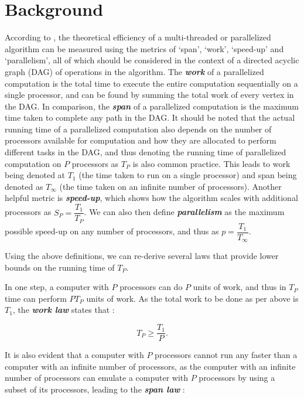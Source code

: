 \documentclass{article}
\begin{document}
\section{Background}

According to \cite{CLRS}, the theoretical efficiency of a multi-threaded or parallelized algorithm can be measured using the metrics of `span', `work', `speed-up' and `parallelism', all of which should be considered in the context of a directed acyclic graph (DAG) of operations in the algorithm.
The \textit{\textbf{work}} of a parallelized computation is the total time to execute the entire computation sequentially on a single processor, and can be found by summing the total work of every vertex in the DAG.
In comparison, the \textit{\textbf{span}} of a parallelized computation is the maximum time taken to complete any path in the DAG.
It should be noted that the actual running time of a parallelized computation also depends on the number of processors available for computation and how they are allocated to perform different tasks in the DAG, and thus denoting the running time of parallelized computation on \(P\) processors as \(T_P\) is also common practice.
This leads to work being denoted at \(T_1\) (the time taken to run on a single processor) and span being denoted as \(T_\infty\) (the time taken on an infinite number of processors).
Another helpful metric is \textit{\textbf{speed-up}}, which shows how the algorithm scales with additional processors as \(S_P = \dfrac{T_1}{T_P}\).
We can also then define \textit{\textbf{parallelism}} as the maximum possible speed-up on any number of processors, and thus as \(p = \dfrac{T_1}{T_\infty}\).

Using the above definitions, we can re-derive several laws that provide lower bounds on the running time of \(T_P\).

In one step, a computer with \(P\) processors can do \(P\) units of work, and thus in \(T_P\) time can perform \(PT_P\) units of work.
As the total work to be done as per above is \(T_1\), the \textit{\textbf{work law}} states that \cite{CLRS}:

\[
    T_P \geq \dfrac{T_1}{P}.
\]

It is also evident that a computer with \(P\) processors cannot run any faster than a computer with an infinite number of processors, as the computer with an infinite number of processors can emulate a computer with \(P\) processors by using a subset of its processors, leading to the \textit{\textbf{span law}} \cite{CLRS}:
\end{document}
